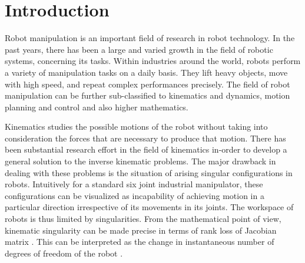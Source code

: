 
\chapter{Introduction} 
Robot manipulation is an important field of research in robot technology. In the past years, there has been a large and varied growth in the field of robotic systems, concerning its tasks. Within industries around the world, robots perform a variety of manipulation tasks on a daily basis. They lift heavy objects, move with high speed, and repeat complex performances precisely. The field of robot manipulation can be further sub-classified to kinematics and dynamics, motion planning and control and also higher mathematics. 
\par
Kinematics studies the possible motions of the robot without taking into consideration the forces that are necessary to produce that motion. There has been substantial research effort in the field of kinematics in-order to develop a general solution to the inverse kinematic problems. The major drawback in dealing with these problems is the situation of arising singular configurations in robots. Intuitively for a standard six joint industrial manipulator, these configurations can be visualized as incapability of achieving motion in a particular direction irrespective of its movements in its joints. The workspace of robots is thus limited by singularities. From the mathematical point of view, kinematic singularity can be made precise in terms of rank loss of Jacobian matrix \cite{donelan2010kinematic}. This can be interpreted as the change in instantaneous number of degrees of freedom of the robot \cite{donelan2010kinematic}. 

